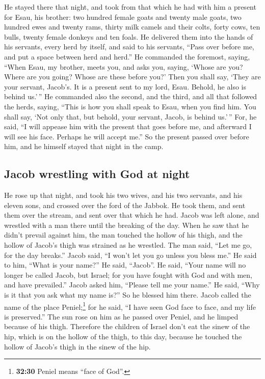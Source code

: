  He stayed there that night, and took from that which he
had with him a present for Esau, his brother:  two
hundred female goats and twenty male goats, two hundred ewes and twenty
rams,  thirty milk camels and their colts, forty cows,
ten bulls, twenty female donkeys and ten foals.  He
delivered them into the hands of his servants, every herd by itself, and
said to his servants, ``Pass over before me, and put a space between
herd and herd.''  He commanded the foremost, saying,
``When Esau, my brother, meets you, and asks you, saying, `Whose are
you? Where are you going? Whose are these before you?' 
Then you shall say, `They are your servant, Jacob's. It is a present
sent to my lord, Esau. Behold, he also is behind us.'\,''
 He commanded also the second, and the third, and all
that followed the herds, saying, ``This is how you shall speak to Esau,
when you find him.  You shall say, `Not only that, but
behold, your servant, Jacob, is behind us.'\,'' For, he said, ``I will
appease him with the present that goes before me, and afterward I will
see his face. Perhaps he will accept me.''  So the
present passed over before him, and he himself stayed that night in the
camp.

\hypertarget{jacob-wrestling-with-god-at-night}{%
\subsection{Jacob wrestling with God at
night}\label{jacob-wrestling-with-god-at-night}}

 He rose up that night, and took his two wives, and his
two servants, and his eleven sons, and crossed over the ford of the
Jabbok.  He took them, and sent them over the stream, and
sent over that which he had.  Jacob was left alone, and
wrestled with a man there until the breaking of the day. 
When he saw that he didn't prevail against him, the man touched the
hollow of his thigh, and the hollow of Jacob's thigh was strained as he
wrestled.  The man said, ``Let me go, for the day
breaks.'' Jacob said, ``I won't let you go unless you bless me.''
 He said to him, ``What is your name?'' He said,
``Jacob''.  He said, ``Your name will no longer be called
Jacob, but Israel; for you have fought with God and with men, and have
prevailed.''  Jacob asked him, ``Please tell me your
name.'' He said, ``Why is it that you ask what my name is?'' So he
blessed him there.  Jacob called the name of the place
Peniel;\footnote{\textbf{32:30} Peniel means ``face of God''.} for he
said, ``I have seen God face to face, and my life is preserved.''
 The sun rose on him as he passed over Peniel, and he
limped because of his thigh.  Therefore the children of
Israel don't eat the sinew of the hip, which is on the hollow of the
thigh, to this day, because he touched the hollow of Jacob's thigh in
the sinew of the hip.

